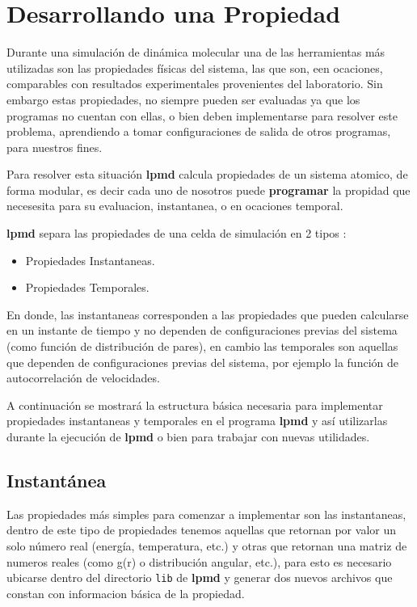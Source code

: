 \documentclass[a4paper,10pt]{scrbook}
\newcommand{\lpmd}{\textbf{lpmd }}
\begin{document}
\section{Desarrollando una Propiedad}

Durante una simulaci\'on de din\'amica molecular una de las herramientas m\'as utilizadas  son las propiedades f\'isicas del sistema, las que son, een ocaciones, comparables con resultados experimentales provenientes del laboratorio. Sin embargo estas propiedades, no siempre pueden ser evaluadas ya que los programas no cuentan con ellas, o bien deben implementarse para resolver este problema, aprendiendo a tomar configuraciones de salida de otros programas, para nuestros fines.

Para resolver esta situaci\'on \lpmd calcula propiedades de un sistema atomico, de forma modular, es decir cada uno de nosotros puede \textbf{programar} la propidad que necesesita para su evaluacion, instantanea, o en ocaciones temporal.

\lpmd separa las propiedades de una celda de simulaci\'on en 2 tipos :

\begin{itemize}
 \item Propiedades Instantaneas.
 \item Propiedades Temporales.
\end{itemize}

En donde, las instantaneas corresponden a las propiedades que pueden calcularse en un instante de tiempo y no dependen de configuraciones previas del sistema (como funci\'on de distribuci\'on de pares), en cambio las temporales son aquellas que dependen de configuraciones previas del sistema, por ejemplo la funci\'on de autocorrelaci\'on de velocidades.

A continuaci\'on se mostrar\'a la estructura b\'asica necesaria para implementar propiedades instantaneas y temporales en el programa \lpmd y as\'i utilizarlas durante la ejecuci\'on de \lpmd o bien para trabajar con nuevas utilidades.

\subsection{Instant\'anea}

Las propiedades m\'as simples para comenzar a implementar son las instantaneas, dentro de este tipo de propiedades tenemos aquellas que retornan por valor un solo n\'umero real (energ\'ia, temperatura, etc.) y otras que retornan una matriz de numeros reales (como g(r) o distribuci\'on angular, etc.), para esto es necesario ubicarse dentro del directorio \verb|lib| de \lpmd y generar dos nuevos archivos que constan con informacion b\'asica de la propiedad.
\end{document}
